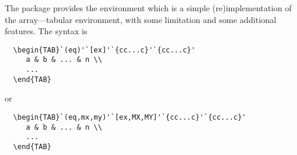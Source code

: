 \documentclass[a4paper]{article}
\begin{document}
The package  provides the  environment
which is a simple (re)\-implementation of the array---tabular environment,
with some limitation and some additional features.  The syntax is
\begin{verbatim}
  \begin{TAB}`(eq)'`[ex]'`{cc...c}'`{cc...c}'
     a & b & ... & n \\
     ...
  \end{TAB}
\end{verbatim}
or 
\begin{verbatim}
  \begin{TAB}`(eq,mx,my)'`[ex,MX,MY]'`{cc...c}'`{cc...c}'
     a & b & ... & n \\
     ...
  \end{TAB}
\end{verbatim}
%
\end{document}
